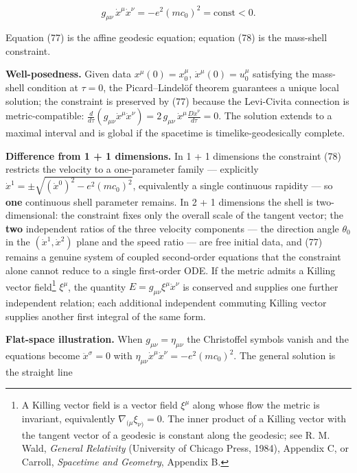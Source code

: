 \documentclass[
]{article}
\begin{document}
\[g_{\mu\nu}\, \dot{x}^{\mu} \dot{x}^{\nu} = - e^{2}(mc_{0})^{2} = \mathrm{const} < 0. \tag{78}\]

Equation (77) is the affine geodesic equation; equation (78) is the
mass-shell constraint.

\textbf{Well-posedness.} Given data \(x^{\mu}(0) = x^{\mu}_{0}\),
\(\dot{x}^{\mu}(0) = u^{\mu}_{0}\) satisfying the mass-shell condition
at \(\tau = 0\), the Picard--Lindelöf theorem guarantees a unique local
solution; the constraint is preserved by (77) because the Levi-Civita
connection is metric-compatible:
\(\frac{d}{d\tau}\left(g_{\mu\nu}\dot{x}^{\mu}\dot{x}^{\nu}\right) = 2\, g_{\mu\nu}\, \dot{x}^{\mu} \frac{D\dot{x}^{\nu}}{d\tau} = 0\).
The solution extends to a maximal interval and is global if the
spacetime is timelike-geodesically complete.

\textbf{Difference from 1 + 1 dimensions.} In 1 + 1 dimensions the
constraint (78) restricts the velocity to a one-parameter family ---
explicitly
\(\dot{x}^{1} = \pm \sqrt{(\dot{x}^{0})^{2} - e^{2}(mc_{0})^{2}}\),
equivalently a single continuous rapidity --- so \textbf{one} continuous
shell parameter remains. In 2 + 1 dimensions the shell is
two-dimensional: the constraint fixes only the overall scale of the
tangent vector; the \textbf{two} independent ratios of the three
velocity components --- the direction angle \(\theta_{0}\) in the
\((\dot{x}^{1}, \dot{x}^{2})\) plane and the speed ratio --- are free
initial data, and (77) remains a genuine system of coupled second-order
equations that the constraint alone cannot reduce to a single
first-order ODE. If the metric admits a Killing vector field\footnote{A
  Killing vector field is a vector field \(\xi^{\mu}\) along whose flow
  the metric is invariant, equivalently
  \(\nabla_{(\mu} \xi_{\nu)} = 0\). The inner product of a Killing
  vector with the tangent vector of a geodesic is constant along the
  geodesic; see R. M. Wald, \emph{General Relativity} (University of
  Chicago Press, 1984), Appendix C, or Carroll, \emph{Spacetime and
  Geometry}, Appendix B.} \(\xi^{\mu}\), the quantity
\(E = g_{\mu\nu} \xi^{\mu} \dot{x}^{\nu}\) is conserved and supplies one
further independent relation; each additional independent commuting
Killing vector supplies another first integral of the same form.

\textbf{Flat-space illustration.} When \(g_{\mu\nu} = \eta_{\mu\nu}\)
the Christoffel symbols vanish and the equations become
\(\ddot{x}^{\sigma} = 0\) with
\(\eta_{\mu\nu} \dot{x}^{\mu} \dot{x}^{\nu} = -e^{2}(mc_{0})^{2}\). The
general solution is the straight line
\end{document}
